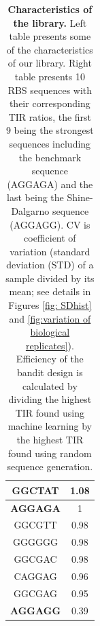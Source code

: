 \documentclass{article}
\begin{document}
\begin{table}[!h]
\begin{minipage}[c]{0.38\textwidth}
\begin{tabular}{|c|c|}
GGCTAT                & 1.08              \\ \hline
\textbf{AGGAGA}                & 1                  \\ \hline
GGCGTT                & 0.98            \\ \hline
GGGGGG                & 0.98             \\ \hline
GGCGAC                & 0.98             \\ \hline
CAGGAG                & 0.96             \\ \hline
GGCGAG                & 0.95             \\ \hline
\textbf{AGGAGG}       & 0.39            \\ \hline
\end{tabular}
\end{minipage}
\caption{\textbf{Characteristics of the library.}
Left table presents some of the characteristics of our library.
Right table presents 10 RBS sequences with their corresponding TIR ratios, the first 9 being the strongest sequences including the benchmark sequence (AGGAGA) and the last being the Shine-Dalgarno sequence (AGGAGG).
CV is coefficient of variation (standard deviation (STD) of a sample divided by its mean; see details in Figures \ref{fig: SDhist} and \ref{fig:variation of biological replicates}).
Efficiency of the bandit design is calculated by dividing the highest TIR found using machine learning by the highest TIR found using random sequence generation. }
\end{table}
\end{document}
